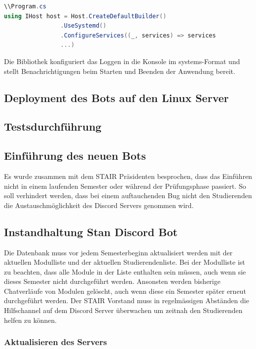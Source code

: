 \documentclass[a4paper, table]{article}
\begin{document}
\begin{lstlisting}[language=csharp]
\\Program.cs
using IHost host = Host.CreateDefaultBuilder()
                .UseSystemd()
                .ConfigureServices((_, services) => services
                ...)
\end{lstlisting}

Die Bibliothek konfiguriert das Loggen in die Konsole im systems-Format und stellt Benachrichtigungen beim Starten und Beenden der Anwendung bereit.

\newpage
\subsection{Deployment des Bots auf den Linux Server}



\newpage
\subsection{Testsdurchführung}

\newpage
\subsection{Einführung des neuen Bots}
Es wurde zusammen mit dem STAIR Präsidenten besprochen, dass das Einführen nicht in einem laufenden Semester oder während der Prüfungsphase passiert.
So soll verhindert werden, dass bei einem auftauchenden Bug nicht den Studierenden die Austauschmöglichkeit des Discord Servers genommen wird.

\newpage
\subsection{Instandhaltung Stan Discord Bot}

Die Datenbank muss vor jedem Semesterbeginn aktualisiert werden mit der aktuellen Modulliste und der aktuellen Studierendenliste.
Bei der Modulliste ist zu beachten, dass alle Module in der Liste enthalten sein müssen, auch wenn sie dieses Semester nicht durchgeführt werden.
Ansonsten werden bisherige Chatverläufe von Modulen gelöscht, auch wenn diese ein Semester später erneut durchgeführt werden.
Der STAIR Vorstand muss in regelmässigen Abständen die Hilfschannel auf dem Discord Server überwachen um zeitnah den Studierenden helfen zu können.

\subsubsection{Aktualisieren des Servers}
\end{document}
